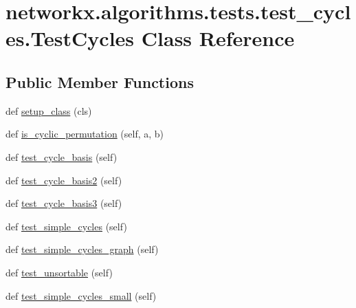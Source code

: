 \hypertarget{classnetworkx_1_1algorithms_1_1tests_1_1test__cycles_1_1TestCycles}{}\section{networkx.\+algorithms.\+tests.\+test\+\_\+cycles.\+Test\+Cycles Class Reference}
\label{classnetworkx_1_1algorithms_1_1tests_1_1test__cycles_1_1TestCycles}
\subsection*{Public Member Functions}
\begin{DoxyCompactItemize}
\item 
def \hyperlink{classnetworkx_1_1algorithms_1_1tests_1_1test__cycles_1_1TestCycles_a5e6e47c0bcb107858c9424a7e1949d1f}{setup\+\_\+class} (cls)
\item 
def \hyperlink{classnetworkx_1_1algorithms_1_1tests_1_1test__cycles_1_1TestCycles_afae739b6f426c027af5df9f219f6ea3e}{is\+\_\+cyclic\+\_\+permutation} (self, a, b)
\item 
def \hyperlink{classnetworkx_1_1algorithms_1_1tests_1_1test__cycles_1_1TestCycles_adc6940f7c5cef6f6c36da1f1112db4a2}{test\+\_\+cycle\+\_\+basis} (self)
\item 
def \hyperlink{classnetworkx_1_1algorithms_1_1tests_1_1test__cycles_1_1TestCycles_a29f4c6e6ca508f1b44c4f2ade9640e2b}{test\+\_\+cycle\+\_\+basis2} (self)
\item 
def \hyperlink{classnetworkx_1_1algorithms_1_1tests_1_1test__cycles_1_1TestCycles_aa8818e293a32e7588c8bb4bc175a26fa}{test\+\_\+cycle\+\_\+basis3} (self)
\item 
def \hyperlink{classnetworkx_1_1algorithms_1_1tests_1_1test__cycles_1_1TestCycles_a2adb30f14203f4022e4a0d3e05a7b922}{test\+\_\+simple\+\_\+cycles} (self)
\item 
def \hyperlink{classnetworkx_1_1algorithms_1_1tests_1_1test__cycles_1_1TestCycles_a3b7d5eb6df4153d7831031cff2af3319}{test\+\_\+simple\+\_\+cycles\+\_\+graph} (self)
\item 
def \hyperlink{classnetworkx_1_1algorithms_1_1tests_1_1test__cycles_1_1TestCycles_a6104692b53a84f3483df774607cd2f50}{test\+\_\+unsortable} (self)
\item 
def \hyperlink{classnetworkx_1_1algorithms_1_1tests_1_1test__cycles_1_1TestCycles_abf4162f6b81a67d1a7bfe39acb7ad321}{test\+\_\+simple\+\_\+cycles\+\_\+small} (self)

\end{DoxyCompactItemize}
